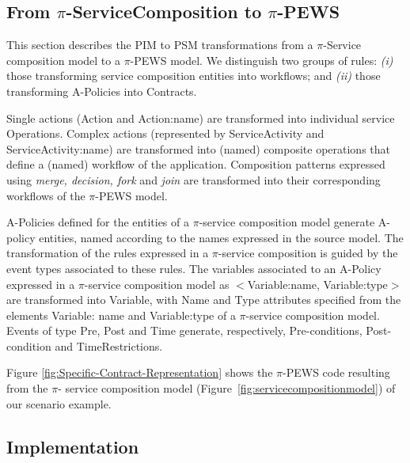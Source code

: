 \documentclass{singlecol-new}
\theoremstyle{TH}{
\newtheorem{lemma}{Lemma}
\newtheorem{theorem}[lemma]{Theorem}
\newtheorem{corrolary}[lemma]{Corrolary}
\newtheorem{conjecture}[lemma]{Conjecture}
\newtheorem{proposition}[lemma]{Proposition}
\newtheorem{claim}[lemma]{Claim}
\newtheorem{stheorem}[lemma]{Wrong Theorem}
\newtheorem{algorithm}{Algorithm}
}
\theoremstyle{THrm}{
\newtheorem{definition}{Definition}[section]
\newtheorem{question}{Question}[section]
\newtheorem{remark}{Remark}
\newtheorem{scheme}{Scheme}
}
\theoremstyle{THhit}{
\newtheorem{case}{Case}[section]
}
\theoremstyle{THhsl}{
\newtheorem{example}{Example}
}
\begin{document}
\subsection{From $\pi$-ServiceComposition to $\pi$-PEWS}

This section describes the PIM to PSM transformations from a $\pi$-Service composition mod\-el to a $\pi$-PEWS model. 
We distinguish two groups of rules: \textit{(i)} those transforming service composition entities into workflows; and \textit{(ii)} those transforming  A-Policies into Contracts.

Single actions ({\sf Action} and {\sf
Action:name}) are transformed into individual service {\sf Operations}.
Complex actions (rep\-re\-sented by {\sf ServiceActivity}  and  {\sf
ServiceActivity:name}) are transformed into (named) composite
operations that define a (named) workflow of the application.
Composition patterns expressed using  {\em merge, decision, fork} and {\em join} are transformed into their corresponding workflows of the $\pi$-PEWS model.

A-Policies defined for the entities of a $\pi$-service composition model generate {\sf A-policy} entities, named according to the names expres\-sed in the source model.
The transformation of the rules expres\-sed in a $\pi$-service composition is guided by the event types associated to these rules. 
The variables associated to an A-Policy expressed in a $\pi$-service composition model as {\sf $<$Variable:name, Variable:type$>$} are transformed into  {\sf Variable}, with  {\sf Name} and {\sf Type} attributes specified from the elements {\sf Variable: name} and {\sf Variable:type} of a $\pi$-service composition model.
%
Events of type {\sf Pre}, {\sf Post} and {\sf Time} generate, respectively, {\sf Pre-conditions}, {\sf Post-condition} and {\sf TimeRestrictions}.

\begin{example}\label{ex:toPublicMusicT6}
Figure \ref{fig:Specific-Contract-Representation} shows the $\pi$-PEWS code resulting from the $\pi$- service composition model (Figure~\ref{fig:servicecompositionmodel}) of our scenario example.
\end{example}

\subsection{Implementation}
\end{document}

